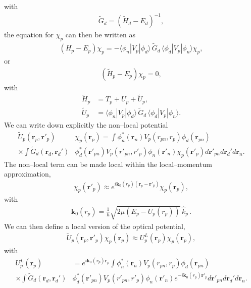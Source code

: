 \documentclass[a4paper,11pt]{article}
\newcommand{\ket}[1]{|{#1} \rangle }
\newcommand{\bra}[1]{\langle {#1}|}
\begin{document}
   with
      \begin{align}\label{eq66}
\tilde G_d=(\tilde H_d-E_d)^{-1},
      \end{align} 
the equation for $\chi_p$ can then be written as
      \begin{align}\label{eq67}
(H_p-E_p)\chi_p=-\bra{\phi_n}V_p\ket{\phi_d}\,\tilde G_d\,\bra{\phi_d}V_p\ket{\phi_n}\chi_p,
      \end{align}
or
\begin{align}\label{eq68}
(\tilde H_p-E_p)\chi_p=0,
\end{align}      
with
\begin{align}\label{eq69}
\nonumber \tilde H_p&=T_p+U_p+\tilde U_p,\\
\tilde U_p&=\bra{\phi_n}V_p\ket{\phi_d}\,\tilde G_d\,\bra{\phi_d}V_p\ket{\phi_n}.
\end{align}  
We can write down explicitly the non--local potential
  \begin{align}\label{eq52}
\nonumber \tilde U_p(\mathbf r_p,\mathbf r'_p)&\chi_p(\mathbf r_p)
 =   \int  \phi_n^*(\mathbf r_n)V_p(r_{pn},r_p)\phi_d(\mathbf r_{pn})\\
\times \int \tilde G_d(\mathbf r_d,\mathbf r_d')&\phi_d^*(\mathbf r'_{pn})V_p(r'_{pn},r'_p)\phi_n(\mathbf r'_n)\chi_p(\mathbf r'_p)d\mathbf r'_{pn}d\mathbf r_d'd\mathbf r_n.
 \end{align}
The non--local term can be made local within the local--momentum approximation,
\begin{align}\label{eq28}
\chi_p(\mathbf r'_p)\approx e^{i\mathbf k_0(r_p)(\mathbf r_p-\mathbf r'_p)}\chi_p(\mathbf r_p),
\end{align}
with 
\begin{align}\label{eq29}
\mathbf k_0(r_p)=\frac{1}{\hbar}\sqrt{2\mu\left(E_p-U_p(r_p)\right)}\,\hat k_p\,.
\end{align}
We can then define a local version of the optical potential,
\begin{align}\label{eq31}
\tilde U_p(\mathbf r_p,\mathbf r'_p)\chi_p(\mathbf r_p)\approx U^L_p(\mathbf r_p)\chi_p(\mathbf r_p),
\end{align}
with
 \begin{align}\label{eq32}
\nonumber U^L_p(\mathbf r_p) &= e^{i\mathbf k_0(r_p)\mathbf r_p}\int  \phi_n^*(\mathbf r_n)V_p(r_{pn},r_p)\phi_d(\mathbf r_{pn})\\
\times \int \tilde G_d(\mathbf r_d,\mathbf r_d')&\phi_d^*(\mathbf r'_{pn})V_p(r'_{pn},r'_p)\phi_n(\mathbf r'_n)e^{-i\mathbf k_0(r_p)\mathbf r'_p}d\mathbf r'_{pn}d\mathbf r_d'd\mathbf r_n.
 \end{align}
\end{document}
